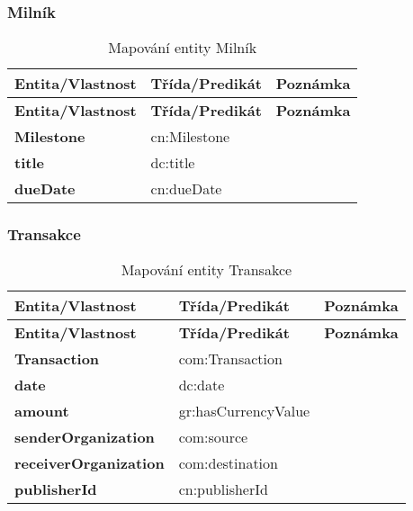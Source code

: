 \subsubsection*{Milník}

\begin{center}
\begin{longtable}{lll}
\label{grid_mlmmh} \\
\multicolumn{1}{l}{\textbf{Entita/Vlastnost}} & 
\multicolumn{1}{l}{\textbf{Třída/Predikát}} & 
\multicolumn{1}{l}{\textbf{Poznámka}} \\ \hline 
\endfirsthead
\multicolumn{1}{l}{\textbf{Entita/Vlastnost}} & 
\multicolumn{1}{l}{\textbf{Třída/Predikát}} & 
\multicolumn{1}{l}{\textbf{Poznámka}} \\ \hline 
\hline
\endhead
\endfoot
\caption{Mapování entity Milník}
\endlastfoot
\textbf{Milestone} & cn:Milestone \\
\textbf{title} & dc:title \\
\textbf{dueDate} & cn:dueDate \\
\end{longtable}
\end{center}

\subsubsection*{Transakce}

\begin{center}
\begin{longtable}{lll}
\label{grid_mlmmh} \\
\multicolumn{1}{l}{\textbf{Entita/Vlastnost}} & 
\multicolumn{1}{l}{\textbf{Třída/Predikát}} & 
\multicolumn{1}{l}{\textbf{Poznámka}} \\ \hline 
\endfirsthead
\multicolumn{1}{l}{\textbf{Entita/Vlastnost}} & 
\multicolumn{1}{l}{\textbf{Třída/Predikát}} & 
\multicolumn{1}{l}{\textbf{Poznámka}} \\ \hline 
\hline
\endhead
\endfoot
\caption{Mapování entity Transakce}
\endlastfoot
\textbf{Transaction} & com:Transaction \\
\textbf{date} & dc:date \\
\textbf{amount} & gr:hasCurrencyValue \\
\textbf{senderOrganization} & com:source \\
\textbf{receiverOrganization} & com:destination \\ 
\textbf{publisherId} & cn:publisherId \\
\end{longtable}
\end{center}

